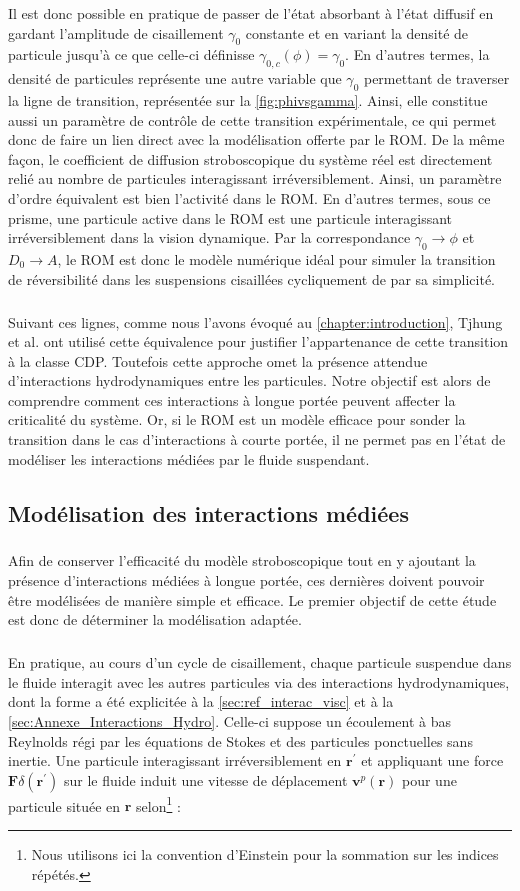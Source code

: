 \noindent Il est donc possible en pratique de passer de l'état absorbant à l'état diffusif en gardant l'amplitude de cisaillement $\gamma_0$ constante et en variant la densité de particule jusqu'à ce que celle-ci définisse $\gamma_{0,c}(\phi) = \gamma_0$. En d'autres termes, la densité de particules représente une autre variable que $\gamma_0$ permettant de traverser la ligne de transition, représentée sur la \autoref{fig:phivsgamma}. Ainsi, elle constitue aussi un paramètre de contrôle de cette transition expérimentale, ce qui permet donc de faire un lien direct avec la modélisation offerte par le ROM. De la même façon, le coefficient de diffusion stroboscopique du système réel est directement relié au nombre de particules interagissant irréversiblement. Ainsi, un paramètre d'ordre équivalent est bien l'activité dans le ROM. En d'autres termes, sous ce prisme, une particule active dans le ROM est une particule interagissant irréversiblement dans la vision dynamique. Par la correspondance $\gamma_0 \rightarrow \phi$ et $D_0\rightarrow A$, le ROM est donc le modèle numérique idéal pour simuler la transition de réversibilité dans les suspensions cisaillées cycliquement de par sa simplicité.

\subparagraph{}Suivant ces lignes, comme nous l'avons évoqué au \autoref{chapter:introduction}, Tjhung et al. \cite{tjhung_criticality_2016} ont utilisé cette équivalence pour justifier l'appartenance de cette transition à la classe CDP. Toutefois cette approche omet la présence attendue d'interactions hydrodynamiques entre les particules. Notre objectif est alors de comprendre comment ces interactions à longue portée peuvent affecter la criticalité du système. Or, si le ROM est un modèle efficace pour sonder la transition dans le cas d'interactions à courte portée, il ne permet pas en l'état de modéliser les interactions médiées par le fluide suspendant.

\subsection{Modélisation des interactions médiées}

\subparagraph{}Afin de conserver l'efficacité du modèle stroboscopique tout en y ajoutant la présence d'interactions médiées à longue portée, ces dernières doivent pouvoir être modélisées de manière simple et efficace. Le premier objectif de cette étude est donc de déterminer la modélisation adaptée.

\subparagraph{}En pratique, au cours d'un cycle de cisaillement, chaque particule suspendue dans le fluide interagit avec les autres particules via des interactions hydrodynamiques, dont la forme a été explicitée à la \autoref{sec:ref_interac_visc} et à la \autoref{sec:Annexe_Interactions_Hydro}. Celle-ci suppose un écoulement à bas Reylnolds régi par les équations de Stokes et des particules ponctuelles sans inertie. Une particule interagissant irréversiblement en $\mathbf{r}^\prime$ et appliquant une force $\mathbf{F}\delta(\mathbf{r}^\prime)$ sur le fluide induit une vitesse de déplacement $\mathbf{v}^p(\mathbf{r})$ pour une particule située en $\mathbf{r}$ selon\footnote{Nous utilisons ici la convention d'Einstein pour la sommation sur les indices répétés.} :


